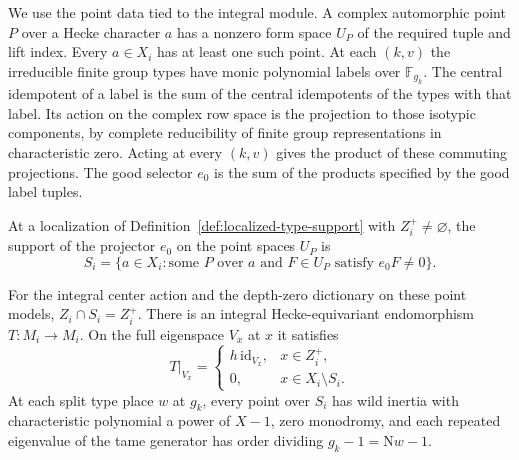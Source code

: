 We use the point data tied to the integral module. A complex
automorphic point \(P\) over a Hecke character \(a\) has a nonzero
form space \(U_P\) of the required tuple and lift index. Every
\(a\in X_i\) has at least one such point. At each \((k,v)\) the
irreducible finite group types have monic polynomial labels over
\(\mathbb F_{g_k}\). The central idempotent of a label is the sum
of the central idempotents of the types with that label. Its
action on the complex row space is the projection to those
isotypic components, by complete reducibility of finite group
representations in characteristic zero. Acting at every
\((k,v)\) gives the product of these commuting projections. The good
selector \(e_0\) is the sum of the products specified by the good
label tuples.

\begin{definition}\label{def:good-projector-support}
At a localization of Definition~\ref{def:localized-type-support} with \(Z_i^+\ne\varnothing\), the support of the projector \(e_0\) on the point spaces \(U_P\) is
\[
 S_i=\{a\in X_i: \text{some }P\text{ over }a
                    \text{ and }F\in U_P\text{ satisfy }e_0F\ne0\}.
\]
\end{definition}

\begin{proposition}
\label{prop:cut-selector}
For the integral center action and the depth-zero dictionary
on these point models, \(Z_i\cap S_i=Z_i^+\). There is an integral Hecke-equivariant endomorphism \(T:M_i\to M_i\). On the full eigenspace \(V_x\) at \(x\) it satisfies
\[
 T|_{V_x}=\begin{cases}h\,\mathrm{id}_{V_x},&x\in Z_i^+,\\0,&x\in X_i\setminus S_i.\end{cases}
\]
At each split type place \(w\) at \(g_k\), every point over
\(S_i\) has wild inertia with characteristic polynomial a power
of \(X-1\), zero monodromy, and each repeated eigenvalue of the tame generator has order
dividing \(g_k-1=\mathrm Nw-1\).
\end{proposition}

